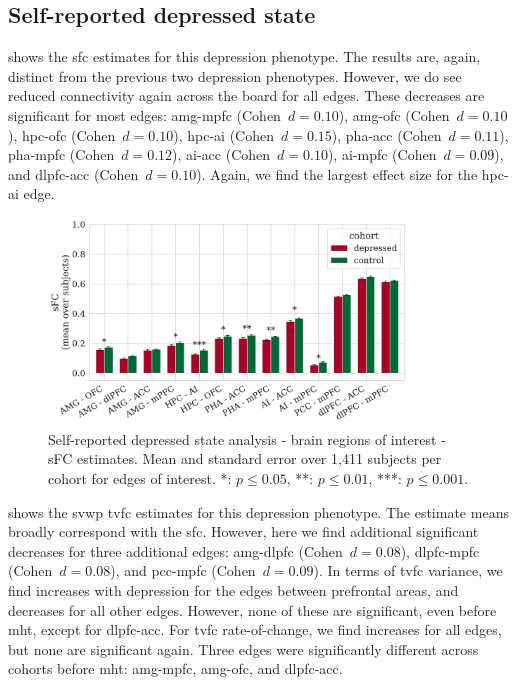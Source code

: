\clearpage
\subsection{Self-reported depressed state}

 shows the \gls{sfc} estimates for this depression phenotype.
The results are, again, distinct from the previous two depression phenotypes.
%
However, we do see reduced connectivity again across the board for all edges.
These decreases are significant for most edges: \gls{amg}-\gls{mpfc} (Cohen~$d = 0.10$), \gls{amg}-\gls{ofc} (Cohen~$d = 0.10$), \gls{hpc}-\gls{ofc} (Cohen~$d = 0.10$), \gls{hpc}-\gls{ai} (Cohen~$d = 0.15$), \gls{pha}-\gls{acc} (Cohen~$d = 0.11$), \gls{pha}-\gls{mpfc} (Cohen~$d = 0.12$), \gls{ai}-\gls{acc} (Cohen~$d = 0.10$), \gls{ai}-\gls{mpfc} (Cohen~$d = 0.09$), and \gls{dlpfc}-\gls{acc} (Cohen~$d = 0.10$).
Again, we find the largest effect size for the \gls{hpc}-\gls{ai} edge.


\begin{figure}[h]
  \centering
  \includegraphics[width=0.85\textwidth]{fig/ukbiobank/TVFC_predictions_summaries/self_reported_depression_state/cohort_comparison/ROI/correlation_TVFC_mean_sFC_edges_of_interest}
  \caption{
    Self-reported depressed state analysis - brain regions of interest - sFC estimates.
    Mean and standard error over 1,411 subjects per cohort for edges of interest.
    *: $p \leq 0.05$, **: $p \leq 0.01$, ***: $p \leq 0.001$.
  }
  \label{fig:ukb-results-srds-roi-cohort-comparison-edges-of-interest-sfc}
\end{figure}


 shows the \gls{svwp} \gls{tvfc} estimates for this depression phenotype.
%
The estimate means broadly correspond with the \gls{sfc}.
However, here we find additional significant decreases for three additional edges: \gls{amg}-\gls{dlpfc} (Cohen~$d = 0.08$), \gls{dlpfc}-\gls{mpfc} (Cohen~$d = 0.08$), and \gls{pcc}-\gls{mpfc} (Cohen~$d = 0.09$).
%
In terms of \gls{tvfc} variance, we find increases with depression for the edges between prefrontal areas, and decreases for all other edges.
However, none of these are significant, even before \gls{mht}, except for \gls{dlpfc}-\gls{acc}.
%
For \gls{tvfc} rate-of-change, we find increases for all edges, but none are significant again.
Three edges were significantly different across cohorts before \gls{mht}: \gls{amg}-\gls{mpfc}, \gls{amg}-\gls{ofc}, and \gls{dlpfc}-\gls{acc}.



